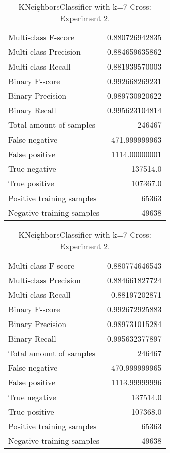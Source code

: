 \begin{table}[H]
\begin{minipage}{0.5\textwidth}
\caption{KNeighborsClassifier with k=7 Cross: Experiment 1.}
\centering
\begin{tabular}{l r}
\toprule
Multi-class F-score & 0.880726942835 \\
Multi-class Precision & 0.884659635862 \\
Multi-class Recall & 0.881939570003 \\
\midrule
Binary F-score & 0.992668269231 \\
Binary Precision & 0.989730920622 \\
Binary Recall & 0.995623104814 \\
\midrule
Total amount of samples & 246467 \\
False negative & 471.999999963 \\
False positive & 1114.00000001 \\
True negative & 137514.0 \\
True positive & 107367.0 \\
\midrule
Positive training samples & 65363 \\
Negative training samples & 49638 \\
\bottomrule
\end{tabular}
\end{minipage}
\hfillx
\begin{minipage}{0.5\textwidth}
\caption{KNeighborsClassifier with k=7 Cross: Experiment 2.}
\centering
\begin{tabular}{l r}
\toprule
Multi-class F-score & 0.880774646543 \\
Multi-class Precision & 0.884661827724 \\
Multi-class Recall & 0.88197202871 \\
\midrule
Binary F-score & 0.992672925883 \\
Binary Precision & 0.989731015284 \\
Binary Recall & 0.995632377897 \\
\midrule
Total amount of samples & 246467 \\
False negative & 470.999999965 \\
False positive & 1113.99999996 \\
True negative & 137514.0 \\
True positive & 107368.0 \\
\midrule
Positive training samples & 65363 \\
Negative training samples & 49638 \\
\bottomrule
\end{tabular}
\end{minipage}
\end{table}
